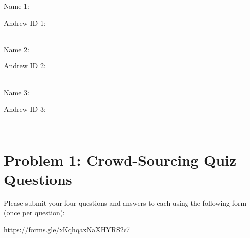\documentclass[12pt]{article}
\begin{document}
Name 1: \begin{tcolorbox}[fit,height=1cm, width=5cm, blank, borderline={1pt}{1pt},nobeforeafter]
    \begin{center}
    \vspace{3mm}
    \large{}
    \end{center}
\end{tcolorbox}
Andrew ID 1: \begin{tcolorbox}[fit,height=1cm, width=5cm, blank, borderline={1pt}{1pt},nobeforeafter]
    \begin{center}
    \vspace{3mm}
    \large{}
    \end{center}
\end{tcolorbox}
    \\
Name 2: \begin{tcolorbox}[fit,height=1cm, width=5cm, blank, borderline={1pt}{1pt},nobeforeafter]
    \begin{center}
    \vspace{3mm}
    \large{}
    \end{center}
\end{tcolorbox}
Andrew ID 2: \begin{tcolorbox}[fit,height=1cm, width=5cm, blank, borderline={1pt}{1pt},nobeforeafter]
    \begin{center}
    \vspace{3mm}
    \large{}
    \end{center}
\end{tcolorbox} \\
Name 3: \begin{tcolorbox}[fit,height=1cm, width=5cm, blank, borderline={1pt}{1pt},nobeforeafter]
    \begin{center}
    \vspace{3mm}
    \large{}
    \end{center}
\end{tcolorbox}
Andrew ID 3: \begin{tcolorbox}[fit,height=1cm, width=5cm, blank, borderline={1pt}{1pt},nobeforeafter]
    \begin{center}
    \vspace{3mm}
    \large{}
    \end{center}
\end{tcolorbox} \\
\vspace{0.5cm}
\vspace{0.5cm}

\newpage
\section*{Problem 1: Crowd-Sourcing Quiz Questions}
Please submit your four questions and answers to each using the following form (once per question):\\
{\centerline{\url{https://forms.gle/xKqhqaxNaXHYRS2c7}}}
\end{document}
